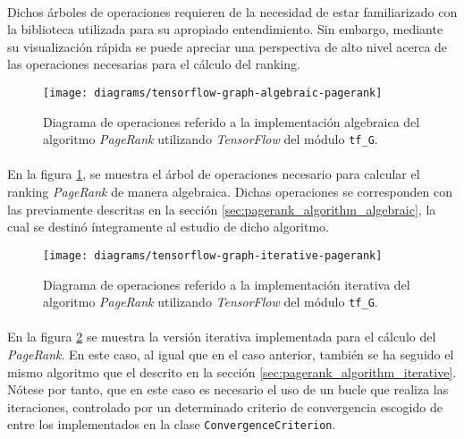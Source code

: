 \documentclass{subfiles}
\begin{document}
          \paragraph{}
          Dichos árboles de operaciones requieren de la necesidad de estar familiarizado con la biblioteca utilizada para su apropiado entendimiento. Sin embargo, mediante su visualización rápida se puede apreciar una perspectiva de alto nivel acerca de las operaciones necesarias para el cálculo del ranking.

          \begin{figure}[h!]
            \centering
            \texttt{[image: diagrams/tensorflow-graph-algebraic-pagerank]}
            \caption{Diagrama de operaciones referido a la implementación algebraica del algoritmo \emph{PageRank} utilizando \emph{TensorFlow} del módulo \texttt{tf\_G}.}
            \label{img:pagerank_algebraic_diagram}
          \end{figure}

          \paragraph{}
          En la figura \ref{img:pagerank_algebraic_diagram}, se muestra el árbol de operaciones necesario para calcular el ranking \emph{PageRank} de manera algebraica. Dichas operaciones se corresponden con las previamente descritas en la sección \ref{sec:pagerank_algorithm_algebraic}, la cual se destinó íntegramente al estudio de dicho algoritmo.

          \begin{figure}[h!]
            \centering
            \texttt{[image: diagrams/tensorflow-graph-iterative-pagerank]}
            \caption{Diagrama de operaciones referido a la implementación iterativa del algoritmo \emph{PageRank} utilizando \emph{TensorFlow} del módulo \texttt{tf\_G}.}
            \label{img:pagerank_iterative_diagram}
          \end{figure}

          \paragraph{}
          En la figura \ref{img:pagerank_iterative_diagram} se muestra la versión iterativa implementada para el cálculo del \emph{PageRank}. En este caso, al igual que en el caso anterior, también se ha seguido el mismo algoritmo que el descrito en la sección \ref{sec:pagerank_algorithm_iterative}. Nótese por tanto, que en este caso es necesario el uso de un bucle que realiza las iteraciones, controlado por un determinado criterio de convergencia escogido de entre los implementados en la clase \texttt{ConvergenceCriterion}.
\end{document}
